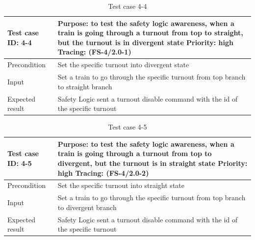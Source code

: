 \begin{table}[H]
	\caption{Test case 4-4}
	\label{table:TCase-FS4-4}
	\begin{center}
		\renewcommand{\arraystretch}{1.8}
		\begin{tabu} 
			to 0.9 \textwidth
			{  X[0.4, c] X[c] }
			\toprule
			Test case ID: 4-4 & Purpose: to test the safety logic awareness, when a train is going through a turnout from top to straight, but the turnout is in divergent state \newline Priority: high \newline Tracing: (FS-4/2.0-1) \\ \midrule
			Precondition      & Set the specific turnout into divergent state                                                                                                                                                           \\
			Input             & Set a train to go through the specific turnout from top branch to straight branch                                                                                                                       \\
			Expected result   & Safety Logic sent a turnout disable command with the id of the specific turnout                                                                                                                         \\ \bottomrule
		\end{tabu}
	\end{center}
\end{table} 



\begin{table}[H]
	\caption{Test case 4-5}
	\label{table:TCase-FS4-5}
	\begin{center}
		\renewcommand{\arraystretch}{1.8}
		\begin{tabu} 
			to 0.9 \textwidth
			{  X[0.4, c] X[c] }
			\toprule
			Test case ID: 4-5 & Purpose: to test the safety logic awareness, when a train is going through a turnout from top to divergent, but the turnout is in straight state \newline Priority: high \newline Tracing: (FS-4/2.0-2) \\ \midrule
			Precondition      & Set the specific turnout into straight state                                                                                                                                                            \\
			Input             & Set a train to go through the specific turnout from top branch to divergent branch                                                                                                                      \\
			Expected result   & Safety Logic sent a turnout disable command with the id of the specific turnout                                                                                                                         \\ \bottomrule
		\end{tabu}
	\end{center}
\end{table} 

